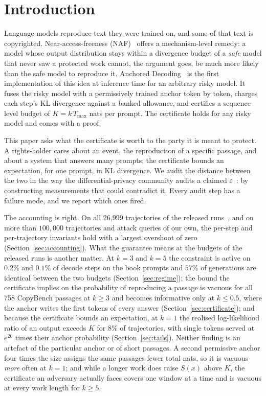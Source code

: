 \section{Introduction}\label{sec:intro}

Language models reproduce text they were trained on, and some of that text is copyrighted. Near-access-freeness (NAF)~\cite{vyas2023provable} offers a mechanism-level remedy: a model whose output distribution stays within a divergence budget of a \emph{safe} model that never saw a protected work cannot, the argument goes, be much more likely than the safe model to reproduce it. Anchored Decoding~\cite{he2026anchored} is the first implementation of this idea at inference time for an arbitrary risky model. It fuses the risky model with a permissively trained anchor token by token, charges each step's KL divergence against a banked allowance, and certifies a sequence-level budget of $K = k\,T_{\max}$ nats per prompt. The certificate holds for any risky model and comes with a proof.

This paper asks what the certificate is worth to the party it is meant to protect. A rights-holder cares about an event, the reproduction of a specific passage, and about a system that answers many prompts; the certificate bounds an expectation, for one prompt, in KL divergence. We audit the distance between the two in the way the differential-privacy community audits a claimed $\varepsilon$~\cite{jagielski2020auditing,nasr2023tight,steinke2023privacy}: by constructing measurements that could contradict it. Every audit step has a failure mode, and we report which ones fired.

The accounting is right. On all 26{,}999 trajectories of the released runs~\cite{vijayavallabh2026audit}, and on more than $100{,}000$ trajectories and attack queries of our own, the per-step and per-trajectory invariants hold with a largest overshoot of zero (Section~\ref{sec:accounting}). What the guarantee means at the budgets of the released runs is another matter. At $k=3$ and $k=5$ the constraint is active on $0.2\%$ and $0.1\%$ of decode steps on the book prompts and $57\%$ of generations are identical between the two budgets (Section~\ref{sec:regime}); the bound the certificate implies on the probability of reproducing a passage is vacuous for all 758 CopyBench passages at $k \ge 3$ and becomes informative only at $k \le 0.5$, where the anchor writes the first tokens of every answer (Section~\ref{sec:certificate}); and because the certificate bounds an expectation, at $k=1$ the realised log-likelihood ratio of an output exceeds $K$ for $8\%$ of trajectories, with single tokens served at $e^{26}$ times their anchor probability (Section~\ref{sec:tails}). Neither finding is an artefact of the particular anchor or of short passages. A second permissive anchor four times the size assigns the same passages fewer total nats, so it is vacuous \emph{more} often at $k=1$; and while a longer work does raise $S(x)$ above $K$, the certificate an adversary actually faces covers one window at a time and is vacuous at every work length for $k \ge 5$.

